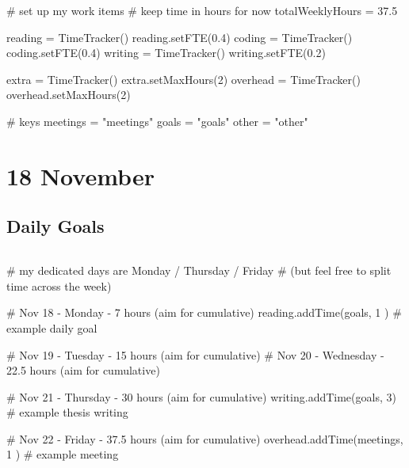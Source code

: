 \documentclass[weekly_log.tex]{subfiles}
\begin{document}

\begin{sagesilent}
    # set up my work items 
    # keep time in hours for now
    totalWeeklyHours = 37.5

    reading  = TimeTracker()
    reading.setFTE(0.4)
    coding   = TimeTracker()
    coding.setFTE(0.4)
    writing  = TimeTracker()
    writing.setFTE(0.2)

    extra    = TimeTracker()
    extra.setMaxHours(2)
    overhead = TimeTracker()
    overhead.setMaxHours(2)

    # keys
    meetings = "meetings"
    goals  = "goals"
    other = "other"
\end{sagesilent}




\section{18 November}

\subsection{Daily Goals}
\begin{todolist}
    \item
\end{todolist}


\begin{verbatim}
\end{verbatim}


\begin{sagesilent}
    # my dedicated days are Monday / Thursday / Friday
    # (but feel free to split time across the week)

    # Nov 18  - Monday    - 7   hours  (aim for cumulative)
    reading.addTime(goals, 1 )      # example daily goal

    # Nov 19  - Tuesday   - 15 hours   (aim for cumulative)
    # Nov 20  - Wednesday - 22.5 hours (aim for cumulative)

    # Nov 21  - Thursday  - 30 hours   (aim for cumulative)
    writing.addTime(goals, 3)       # example thesis writing

    # Nov 22  - Friday    - 37.5 hours (aim for cumulative)
    overhead.addTime(meetings, 1 )  # example meeting

\end{sagesilent}
\end{document}

